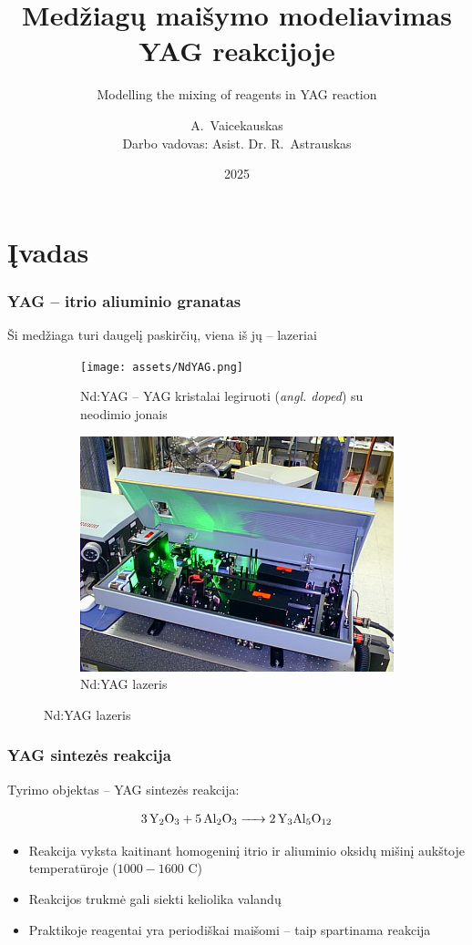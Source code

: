 \documentclass{beamer}
\date{2025}
\title[]{Medžiagų maišymo modeliavimas YAG reakcijoje}
\subtitle{Modelling the mixing of reagents in YAG reaction}
\author[Arnas Vaicekauskas]
{
    A.~Vaicekauskas\inst{1}\\ 
    \small Darbo vadovas: Asist. Dr. R.~Astrauskas\inst{1}
}
\institute[MIF]
{
  \inst{1}
  Matematikos ir informatikos fakultetas\\
  Vilniaus Universitetas
}
\begin{document}
\frame{\titlepage}

\frame{
  \tableofcontents[currentsubsection,subsectionstyle=show]
}

\section{Įvadas}

\begin{frame}
  \frametitle{YAG -- itrio aliuminio granatas}

  Ši medžiaga turi daugelį paskirčių, viena iš jų -- lazeriai

  \begin{figure}
    \centering
    \begin{subfigure}[t]{0.45\linewidth}
      \texttt{[image: assets/NdYAG.png]}
      \caption{Nd:YAG -- YAG kristalai legiruoti (\textit{angl. doped}) su neodimio jonais}
    \end{subfigure}
    \hfill
    \begin{subfigure}[t]{0.45\linewidth}
      \includegraphics[width=\linewidth]{assets/NdYAG-laser.jpg}
      \caption{Nd:YAG lazeris}
    \end{subfigure}
  \end{figure}
\end{frame}

\begin{frame}
  \frametitle{YAG sintezės reakcija}

  Tyrimo objektas -- YAG sintezės reakcija:

  \centering
  \begin{align*}
    \ce{3Y_2O_3 + 5Al_2O_3 -> 2Y_3Al_5O_{12}}
  \end{align*}    

  \begin{itemize}
    \item Reakcija vyksta kaitinant homogeninį itrio ir aliuminio oksidų mišinį aukštoje temperatūroje ($1000-1600$ C\degree)
    \item Reakcijos trukmė gali siekti keliolika valandų
    \item Praktikoje reagentai yra periodiškai maišomi -- taip spartinama reakcija 
  \end{itemize}

\end{frame}
\end{document}
